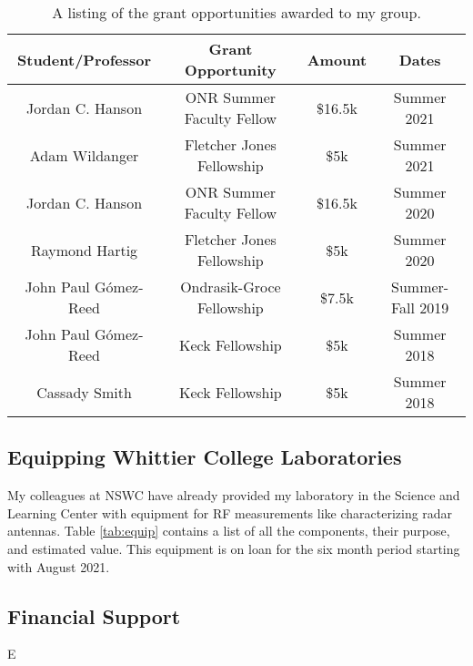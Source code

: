 \documentclass[../../../main.tex]{subfiles}
\begin{document}
\begin{table}
\centering
\begin{tabular}{c c c c}
Student/Professor & Grant Opportunity & Amount & Dates \\ \hline
Jordan C. Hanson & ONR Summer Faculty Fellow & \$16.5k & Summer 2021 \\
Adam Wildanger & Fletcher Jones Fellowship & \$5k & Summer 2021 \\
Jordan C. Hanson & ONR Summer Faculty Fellow & \$16.5k & Summer 2020 \\
Raymond Hartig & Fletcher Jones Fellowship & \$5k & Summer 2020 \\
John Paul G\'{o}mez-Reed & Ondrasik-Groce Fellowship & \$7.5k & Summer-Fall 2019 \\
John Paul G\'{o}mez-Reed & Keck Fellowship & \$5k & Summer 2018 \\
Cassady Smith & Keck Fellowship & \$5k & Summer 2018 \\
\end{tabular}
\caption{\label{tab:funds} A listing of the grant opportunities awarded to my group.}
\end{table}
 
\subsection{Equipping Whittier College Laboratories}

My colleagues at NSWC have already provided my laboratory in the Science and Learning Center with equipment for RF measurements like characterizing radar antennas.  Table \ref{tab:equip} contains a list of all the components, their purpose, and estimated value.  This equipment is on loan for the six month period starting with August 2021.

\subsection{Financial Support}
E
\end{document}

